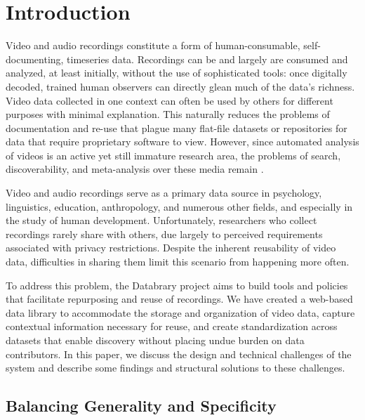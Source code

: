\documentclass{sig-alternate}
\begin{document}


\section{Introduction}

Video and audio recordings constitute a form of human-consumable, self-documenting, timeseries data.
Recordings can be and largely are consumed and analyzed, at least initially, without the use of sophisticated tools: once digitally decoded, trained human observers can directly glean much of the data's richness.
Video data collected in one context can often be used by others for different purposes with minimal explanation.
This naturally reduces the problems of documentation and re-use that plague many flat-file datasets or repositories for data that require proprietary software to view.
However, since automated analysis of videos is an active yet still immature research area, the problems of search, discoverability, and meta-analysis over these media remain \cite{Albertson_2013, Lanagan_Smeaton_2012}.

Video and audio recordings serve as a primary data source in psychology, linguistics, education, anthropology, and numerous other fields, and especially in the study of human development.
Unfortunately, researchers who collect recordings rarely share with others, due largely to perceived requirements associated with privacy restrictions. Despite the inherent reusability of video data, difficulties in sharing them limit this scenario from happening more often.

To address this problem, the Databrary project aims to build tools and policies that facilitate repurposing and reuse of recordings.
We have created a web-based data library to accommodate the storage and organization of video data, capture contextual information necessary for reuse, and create standardization across datasets that enable discovery without placing undue burden on data contributors.
In this paper, we discuss the design and technical challenges of the system and describe some findings and structural solutions to these challenges.

\subsection{Balancing Generality and Specificity}
\end{document}
